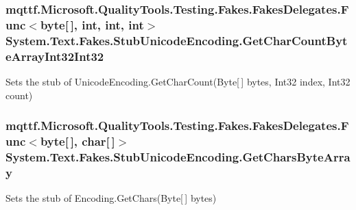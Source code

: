 \hypertarget{class_system_1_1_text_1_1_fakes_1_1_stub_unicode_encoding_aaefb4995217ab4dd93773a268fdca142}{
\subsubsection[{Get\-Char\-Count\-Byte\-Array\-Int32\-Int32}]{\setlength{\rightskip}{0pt plus 5cm}mqttf.\-Microsoft.\-Quality\-Tools.\-Testing.\-Fakes.\-Fakes\-Delegates.\-Func$<$byte\mbox{[}$\,$\mbox{]}, int, int, int$>$ System.\-Text.\-Fakes.\-Stub\-Unicode\-Encoding.\-Get\-Char\-Count\-Byte\-Array\-Int32\-Int32}}\label{class_system_1_1_text_1_1_fakes_1_1_stub_unicode_encoding_aaefb4995217ab4dd93773a268fdca142}


Sets the stub of Unicode\-Encoding.\-Get\-Char\-Count(\-Byte\mbox{[}$\,$\mbox{]} bytes, Int32 index, Int32 count)

\hypertarget{class_system_1_1_text_1_1_fakes_1_1_stub_unicode_encoding_a56c5305dee61fe19356529d6321207c9}{
\subsubsection[{Get\-Chars\-Byte\-Array}]{\setlength{\rightskip}{0pt plus 5cm}mqttf.\-Microsoft.\-Quality\-Tools.\-Testing.\-Fakes.\-Fakes\-Delegates.\-Func$<$byte\mbox{[}$\,$\mbox{]}, char\mbox{[}$\,$\mbox{]}$>$ System.\-Text.\-Fakes.\-Stub\-Unicode\-Encoding.\-Get\-Chars\-Byte\-Array}}\label{class_system_1_1_text_1_1_fakes_1_1_stub_unicode_encoding_a56c5305dee61fe19356529d6321207c9}


Sets the stub of Encoding.\-Get\-Chars(\-Byte\mbox{[}$\,$\mbox{]} bytes)

